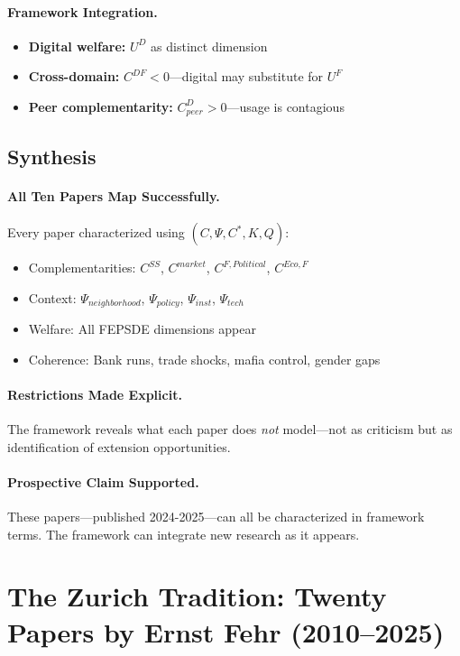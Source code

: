 \documentclass[12pt,a4paper]{article}
\begin{document}
\paragraph{Framework Integration.}
\begin{itemize}
  \item \textbf{Digital welfare:} $U^D$ as distinct dimension
  \item \textbf{Cross-domain:} $C^{DF} < 0$---digital may substitute for $U^F$
  \item \textbf{Peer complementarity:} $C^{D}_{peer} > 0$---usage is contagious
\end{itemize}

\subsection{Synthesis}

\paragraph{All Ten Papers Map Successfully.}
Every paper characterized using $(C, \Psi, C^*, K, Q)$:
\begin{itemize}
  \item Complementarities: $C^{SS}$, $C^{market}$, $C^{F,Political}$, $C^{Eco,F}$
  \item Context: $\Psi_{neighborhood}$, $\Psi_{policy}$, $\Psi_{inst}$, $\Psi_{tech}$
  \item Welfare: All FEPSDE dimensions appear
  \item Coherence: Bank runs, trade shocks, mafia control, gender gaps
\end{itemize}

\paragraph{Restrictions Made Explicit.}
The framework reveals what each paper does \emph{not} model---not as criticism
but as identification of extension opportunities.

\paragraph{Prospective Claim Supported.}
These papers---published 2024-2025---can all be characterized in framework terms.
The framework can integrate new research as it appears.

\section{The Zurich Tradition: Twenty Papers by Ernst Fehr (2010--2025)}
\label{app:fehrpapers}
\end{document}
